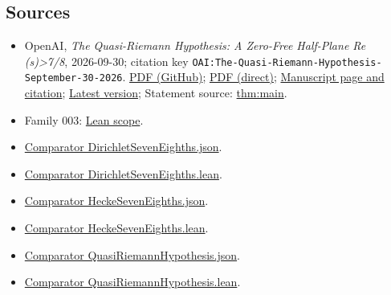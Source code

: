 \documentclass[11pt]{article}
\begin{document}
\subsection{Sources}
\begin{itemize}
\item OpenAI, \emph{The Quasi-Riemann Hypothesis: A Zero-Free Half-Plane Re (s)>7/8}, 2026-09-30; citation key \texttt{OAI:The-Quasi-Riemann-Hypothesis-September-30-2026}. \href{https://github.com/openai/math/blob/adc7f1241b42e322a6451854ab7e4b4c146bf78a/preprints/The-Quasi-Riemann-Hypothesis-September-30-2026/paper.pdf}{PDF (GitHub)}; \href{https://github.com/openai/math/raw/adc7f1241b42e322a6451854ab7e4b4c146bf78a/preprints/The-Quasi-Riemann-Hypothesis-September-30-2026/paper.pdf}{PDF (direct)}; \href{https://github.com/openai/math/blob/adc7f1241b42e322a6451854ab7e4b4c146bf78a/preprints/The-Quasi-Riemann-Hypothesis-September-30-2026/README.md}{Manuscript page and citation}; \href{https://github.com/openai/math/blob/main/preprints/The-Quasi-Riemann-Hypothesis-September-30-2026/paper.pdf}{Latest version}; Statement source: \href{https://github.com/openai/math/blob/adc7f1241b42e322a6451854ab7e4b4c146bf78a/preprints/The-Quasi-Riemann-Hypothesis-September-30-2026/build/paper.tex\#L106}{thm:main}.
\item Family 003: \href{https://github.com/openai/math/blob/adc7f1241b42e322a6451854ab7e4b4c146bf78a/lean/docs/003.md}{Lean scope}.
\item \href{https://github.com/openai/math/blob/adc7f1241b42e322a6451854ab7e4b4c146bf78a/lean/ComparatorChallenges/DirichletSevenEighths.json}{Comparator DirichletSevenEighths.json}.
\item \href{https://github.com/openai/math/blob/adc7f1241b42e322a6451854ab7e4b4c146bf78a/lean/ComparatorChallenges/DirichletSevenEighths.lean}{Comparator DirichletSevenEighths.lean}.
\item \href{https://github.com/openai/math/blob/adc7f1241b42e322a6451854ab7e4b4c146bf78a/lean/ComparatorChallenges/HeckeSevenEighths.json}{Comparator HeckeSevenEighths.json}.
\item \href{https://github.com/openai/math/blob/adc7f1241b42e322a6451854ab7e4b4c146bf78a/lean/ComparatorChallenges/HeckeSevenEighths.lean}{Comparator HeckeSevenEighths.lean}.
\item \href{https://github.com/openai/math/blob/adc7f1241b42e322a6451854ab7e4b4c146bf78a/lean/ComparatorChallenges/QuasiRiemannHypothesis.json}{Comparator QuasiRiemannHypothesis.json}.
\item \href{https://github.com/openai/math/blob/adc7f1241b42e322a6451854ab7e4b4c146bf78a/lean/ComparatorChallenges/QuasiRiemannHypothesis.lean}{Comparator QuasiRiemannHypothesis.lean}.

\end{itemize}
\end{document}
